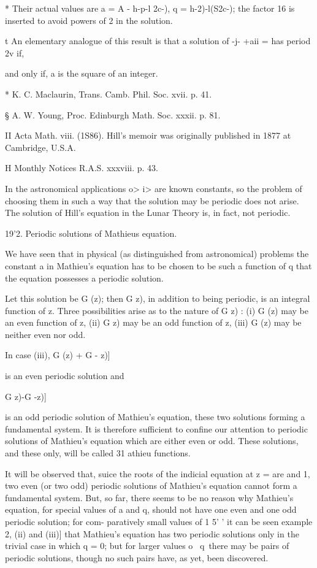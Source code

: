 * Their actual values are a = A - h-p-l 2c-), q = h-2)-l(S2c-); the
factor 16 is inserted to avoid powers of 2 in the solution.

t An elementary analogue of this result is that a solution of -j- +aii
= has period 2v if,

and only if, a is the square of an integer.

* K. C. Maclaurin, Trans. Camb. Phil. Soc. xvii. p. 41.

§ A. W. Young, Proc. Edinburgh Math. Soc. xxxii. p. 81.

II Acta Math. viii. (1S86). Hill's memoir was originally published in
1877 at Cambridge, U.S.A.

H Monthly Notices R.A.S. xxxviii. p. 43.

%
%

In the astronomical applications o> i>  are known constants, so the
problem of choosing them in such a way that the solution may be
periodic does not arise. The solution of Hill's equation in the Lunar
Theory is, in fact, not periodic.

19'2. Periodic solutions of Mathieus equation.

We have seen that in physical (as distinguished from astronomical)
problems the constant a in Mathieu's equation has to be chosen to be
such a function of q that the equation possesses a periodic solution.

Let this solution be G (z); then G z), in addition to being periodic,
is an integral function of z. Three possibilities arise as to the
nature of G z) : (i) G (z) may be an even function of z, (ii) G z) may
be an odd function of z, (iii) G (z) may be neither even nor odd.

In case (iii), G (z) + G - z)]

is an even periodic solution and

  G z)-G -z)]

is an odd periodic solution of Mathieu's equation, these two solutions
forming a fundamental system. It is therefore sufficient to confine
our attention to periodic solutions of Mathieu's equation which are
either even or odd. These solutions, and these only, will be called 31
athieu functions.

It will be observed that, suice the roots of the indicial equation at
z = are and 1, two even (or two odd) periodic solutions of Mathieu's
equation cannot form a fundamental system. But, so far, there seems to
be no reason why Mathieu's equation, for special values of a and q,
should not have one even and one odd periodic solution; for com-
paratively small values of 1 5' ' it can be seen  example 2,
(ii) and (iii)] that Mathieu's equation has two periodic solutions
only in the trivial case in which q = 0; but for larger values o \ q\
there may be pairs of periodic solutions, though no such pairs have,
as yet, been discovered.

